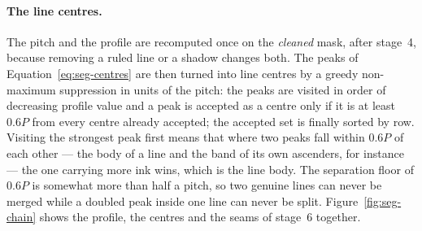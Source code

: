 \paragraph{The line centres.}
The pitch and the profile are recomputed once on the \emph{cleaned} mask, after stage~4, because removing a ruled line or a shadow changes both.
The peaks of Equation~\ref{eq:seg-centres} are then turned into line centres by a greedy non-maximum suppression in units of the pitch: the peaks are visited in order of decreasing profile value and a peak is accepted as a centre only if it is at least $0.6P$ from every centre already accepted; the accepted set is finally sorted by row.
Visiting the strongest peak first means that where two peaks fall within $0.6P$ of each other --- the body of a line and the band of its own ascenders, for instance --- the one carrying more ink wins, which is the line body.
The separation floor of $0.6P$ is somewhat more than half a pitch, so two genuine lines can never be merged while a doubled peak inside one line can never be split.
Figure~\ref{fig:seg-chain} shows the profile, the centres and the seams of stage~6 together.

